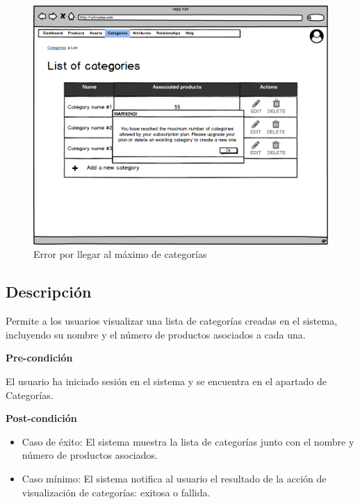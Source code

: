 \begin{figure}[H]
    \includegraphics[width=1\linewidth]{mockups/RF4.1_2.png}
    \caption{Error por llegar al máximo de categorías}
   \end{figure}
\vspace{1.0cm}


\subsection*{Descripción}
Permite a los usuarios visualizar una lista de categorías creadas en el sistema, incluyendo su nombre y el número de productos asociados a cada una.\par
\vspace{0.15cm}

\textbf{Pre-condición}\par
El usuario ha iniciado sesión en el sistema y se encuentra en el apartado de Categorías. \par
\vspace{0.15cm}

\textbf{Post-condición}
\begin{itemize}
    \item Caso de éxito: El sistema muestra la lista de categorías junto con el nombre y número de productos asociados.
    \item Caso mínimo: El sistema notifica al usuario el resultado de la acción de visualización de categorías: exitosa o fallida.
\end{itemize}


